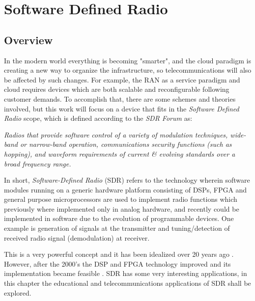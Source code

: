 \chapter{Software Defined Radio}
\label{chap:sdr}

\section{Overview}%
\label{sdr:overview}

In the modern world everything is becoming "smarter", and the cloud paradigm is
creating a new way to organize the infrastructure, so telecommunications will
also be affected by such changes. For example, the RAN as a service  paradigm
and cloud requires devices which are both scalable and reconfigurable following
customer demands. To accomplish that, there are some schemes and theories
involved, but this work will focus on a device that fits in the \emph{Software
Defined Radio} scope, which is defined according to the \emph{SDR Forum}
\cite{web:sdrforum} as:\\

\begin{displayquote}
\textit{Radios that provide software control of a variety of modulation techniques,
wide-band or narrow-band operation, communications security functions (such as
hopping), and waveform requirements of current \& evolving standards over a
broad frequency range.}\\
\end{displayquote}

In short, \textit{Software-Defined Radio} (SDR) refers to the technology wherein
software modules running on a generic hardware platform consisting of DSPs, FPGA
and general purpose microprocessors are used to implement radio functions which
previously where implemented only in analog hardware, and recently could be
implemented in software due to the evolution of programmable devices. One
example is generation of signals at the transmitter and tuning/detection of
received radio signal (demodulation) at receiver.

This is a very powerful concept and it has been idealized over 20 years ago
\cite{ladimer2009}. However, after the 2000's the DSP and FPGA technology
improved and its implementation became feasible \cite{ladimer2009}. SDR has some
very interesting applications, in this chapter the educational and
telecommunications applications of SDR shall be explored.

